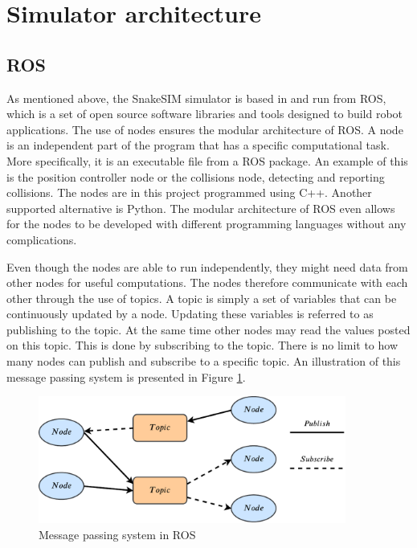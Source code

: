 \section{Simulator architecture}\label{sec:sim_architecture}

\subsection{ROS}

As mentioned above, the SnakeSIM simulator is based in and run from ROS, which is a set of open source software libraries and tools designed to build robot applications.
The use of nodes ensures the modular architecture of ROS. A node is an independent part of the program that has a specific computational task. More specifically, it is an executable file from a ROS package. An example of this is the position controller node or the collisions node, detecting and reporting collisions. The nodes are in this project programmed using C++. Another supported alternative is Python. The modular architecture of ROS even allows for the nodes to be developed with different programming languages without any complications.

Even though the nodes are able to run independently, they might need data from other nodes for useful computations. The nodes therefore communicate with each other through the use of topics. A topic is simply a set of variables that can be continuously updated by a node. Updating these variables is referred to as publishing to the topic. At the same time other nodes may read the values posted on this topic. This is done by subscribing to the topic. There is no limit to how many nodes can publish and subscribe to a specific topic. An illustration of this message passing system is presented in Figure \ref{fig:nodesntopics}.

\begin{figure}
    \centering
    \includegraphics[width=0.9\textwidth]{figures/simulator/nodesntopics.pdf}
    \caption{Message passing system in ROS}
    \label{fig:nodesntopics}
\end{figure}

